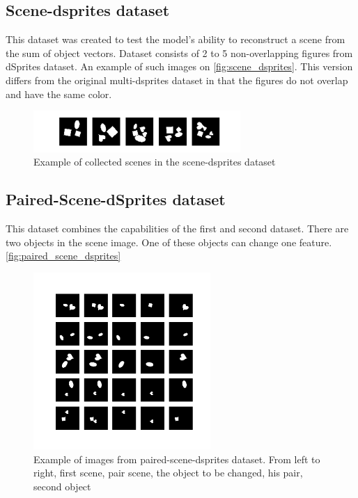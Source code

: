 \documentclass{article}
\begin{document}
    \subsection{Scene-dsprites dataset}

    This dataset was created to test the model's ability to reconstruct
    a scene from the sum of object vectors.
    Dataset consists of 2 to 5 non-overlapping figures from dSprites dataset.
    An example of such images on \autoref{fig:scene_dsprites}. This version differs from
    the original multi-dsprites dataset in that the figures do not overlap
    and have the same color.

    \begin{figure}[ht]
        \centering
        \includegraphics[width=0.7\textwidth]{img/datasets/scene-dsprites}
        \caption{Example of collected scenes in the scene-dsprites dataset}
        \label{fig:scene_dsprites}
    \end{figure}

    \subsection{Paired-Scene-dSprites dataset}

    This dataset combines the capabilities of the first and second dataset.
    There are two objects in the scene image.
    One of these objects can change one feature. \autoref{fig:paired_scene_dsprites}

    \begin{figure}[ht]
        \centering
        \includegraphics[width=0.6\textwidth]{img/datasets/paired-scenes-dsprites}
        \caption{Example of images from paired-scene-dsprites dataset. From left to right,
            first scene, pair scene, the object to be changed, his pair, second object}
        \label{fig:paired_scene_dsprites}
    \end{figure}
\end{document}
